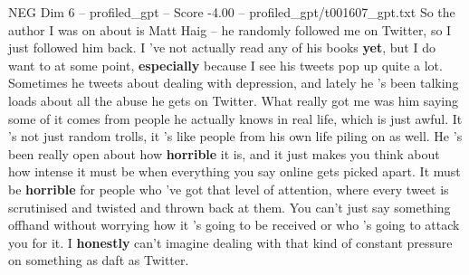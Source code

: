 \begin{textsample}{NEG Dim 6 – profiled\_gpt – Score -4.00 – profiled\_gpt/t001607\_gpt.txt}  \label{ex:f6_neg_001}
So the author I was on about is Matt Haig – he randomly followed me on Twitter, so I just followed him back.
I ’ve not actually read any of his books \textbf{yet}, but I do want to at some point, \textbf{especially} because I see his tweets pop up quite a lot.
Sometimes he tweets about dealing with depression, and lately he ’s been talking loads about all the abuse he gets on Twitter.
What really got me was him saying some of it comes from people he actually knows in real life, which is just awful.
It ’s not just random trolls, it ’s like people from his own life piling on as well.
He ’s been really open about how \textbf{horrible} it is, and it just makes you think about how intense it must be when everything you say online gets picked apart.
It must be \textbf{horrible} for people who ’ve got that level of attention, where every tweet is scrutinised and twisted and thrown back at them.
You can't just say something offhand without worrying how it ’s going to be received or who ’s going to attack you for it.
I \textbf{honestly} can't imagine dealing with that kind of constant pressure on something as daft as Twitter.

\end{textsample}
